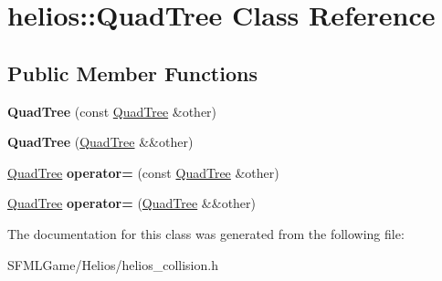 \hypertarget{classhelios_1_1_quad_tree}{}\section{helios\+:\+:Quad\+Tree Class Reference}
\label{classhelios_1_1_quad_tree}
\subsection*{Public Member Functions}
\begin{DoxyCompactItemize}
\item 
\hypertarget{classhelios_1_1_quad_tree_a1962c736be4f9eb0b47fa8c7a85ed08f}{}{\bfseries Quad\+Tree} (const \hyperlink{classhelios_1_1_quad_tree}{Quad\+Tree} \&other)\label{classhelios_1_1_quad_tree_a1962c736be4f9eb0b47fa8c7a85ed08f}

\item 
\hypertarget{classhelios_1_1_quad_tree_af13157d74810ce987772ece80171970c}{}{\bfseries Quad\+Tree} (\hyperlink{classhelios_1_1_quad_tree}{Quad\+Tree} \&\&other)\label{classhelios_1_1_quad_tree_af13157d74810ce987772ece80171970c}

\item 
\hypertarget{classhelios_1_1_quad_tree_a22b2d8d85e8d1dbc2fe660ac4a4d53d2}{}\hyperlink{classhelios_1_1_quad_tree}{Quad\+Tree} {\bfseries operator=} (const \hyperlink{classhelios_1_1_quad_tree}{Quad\+Tree} \&other)\label{classhelios_1_1_quad_tree_a22b2d8d85e8d1dbc2fe660ac4a4d53d2}

\item 
\hypertarget{classhelios_1_1_quad_tree_a7c4b5323fb9e7c4ae83ec1ac011c77ab}{}\hyperlink{classhelios_1_1_quad_tree}{Quad\+Tree} {\bfseries operator=} (\hyperlink{classhelios_1_1_quad_tree}{Quad\+Tree} \&\&other)\label{classhelios_1_1_quad_tree_a7c4b5323fb9e7c4ae83ec1ac011c77ab}

\end{DoxyCompactItemize}


The documentation for this class was generated from the following file\+:\begin{DoxyCompactItemize}
\item 
S\+F\+M\+L\+Game/\+Helios/helios\+\_\+collision.\+h\end{DoxyCompactItemize}
